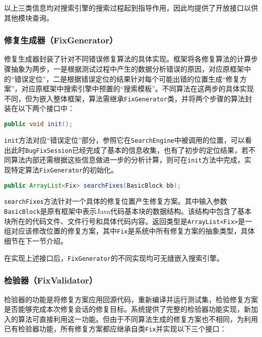 以上三类信息均对搜索引擎的搜索过程起到指导作用，因此均提供了开放接口以供其他模块查询。

\subsubsection{修复生成器（FixGenerator）}%

修复生成器封装了针对不同错误修复算法的具体实现。框架将各修复算法的计算步骤抽象为两步，一是根据测试过程中产生的数据分析错误的原因，对应原框架中的“错误定位”，二是根据错误定位的结果针对每个可能出错的位置生成“修复方案”，对应原框架中搜索引擎中预置的“搜索模板”。不同算法在这两步的具体实现不同，但为嵌入整体框架，算法需继承\texttt{FixGenerator}类，并将两个步骤的算法封装在以下两个接口中：

\begin{lstlisting}[frame=single,language=Java,basicstyle=\ttfamily\footnotesize,tabsize=2]
public void init();
\end{lstlisting}

\texttt{init}方法对应“错误定位”部分，参照它在\texttt{SearchEngine}中被调用的位置，可以看出此时\texttt{BugFixSession}已经完成了基本的信息收集，也有了初步的定位结果，若不同算法内部还需根据这些信息做进一步的分析计算，则可在\texttt{init}方法中完成，实现特定算法\texttt{FixGenerator}的初始化。

\begin{lstlisting}[frame=single,language=Java,basicstyle=\ttfamily\footnotesize,tabsize=2]
public ArrayList<Fix> searchFixes(BasicBlock bb);
\end{lstlisting}

\texttt{searchFixes}方法针对一个具体的修复位置产生修复方案。其中输入参数\texttt{BasicBlock}是原有框架中表示Java代码基本块的数据结构。该结构中包含了基本块所在的代码文件、文件行号和具体代码内容。返回类型是\texttt{ArrayList<Fix>}是一组对应该修改位置的修复方案，其中\texttt{Fix}是系统中所有修复方案的抽象类型，具体细节在下一节介绍。

在实现上述接口后，\texttt{FixGenerator}的不同实现均可无缝嵌入搜索引擎。

\subsubsection{检验器（FixValidator）}%
检验器的功能是将修复方案应用回源代码，重新编译并运行测试集，检验修复方案是否能够完成本次修复会话的修复目标。系统提供了完整的检验器功能实现，新加入的算法可直接利用这一功能。但由于不同算法生成的修复方案也不相同，为利用已有检验器功能，所有修复方案都应继承自类\texttt{Fix}并实现以下三个接口：


